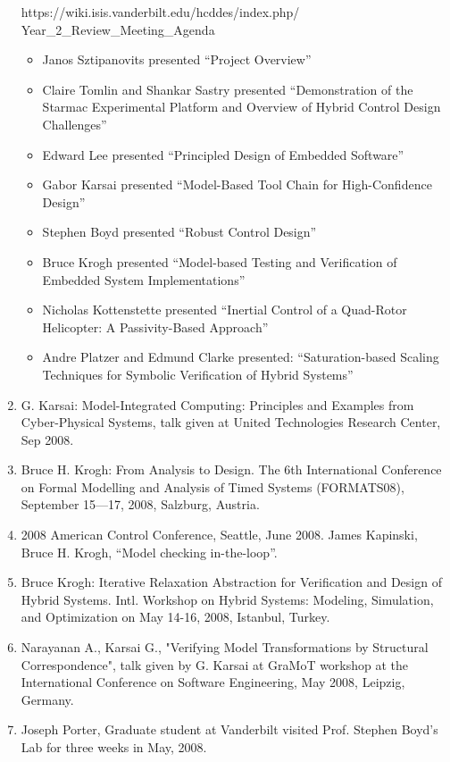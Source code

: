 \begin{enumerate}
https://wiki.isis.vanderbilt.edu/hcddes/index.php/ \\
\indent Year\_2\_Review\_Meeting\_Agenda

\begin{itemize}
\item Janos Sztipanovits presented ``Project Overview''
\item Claire Tomlin and Shankar Sastry presented ``Demonstration of the Starmac Experimental Platform and Overview of Hybrid Control Design Challenges''
\item Edward Lee presented ``Principled Design of Embedded Software''
\item Gabor Karsai presented ``Model-Based Tool Chain for High-Confidence Design''
\item Stephen Boyd presented ``Robust Control Design''
\item Bruce Krogh presented ``Model-based Testing and Verification of Embedded System Implementations''
\item Nicholas Kottenstette presented ``Inertial Control of a Quad-Rotor Helicopter: A Passivity-Based Approach''
\item Andre Platzer and Edmund Clarke presented: ``Saturation-based Scaling Techniques for Symbolic Verification of Hybrid Systems''
\end{itemize}
\item G. Karsai: Model-Integrated Computing: Principles and Examples from Cyber-Physical Systems, talk given at United Technologies Research Center, Sep 2008.
\item Bruce H. Krogh: From Analysis to Design. The 6th International Conference on Formal Modelling and Analysis of Timed Systems (FORMATS08), September 15—17, 2008, Salzburg, Austria. 
\item 2008 American Control Conference, Seattle, June 2008. James Kapinski, Bruce H. Krogh, ``Model checking in-the-loop''.
\item Bruce Krogh: Iterative Relaxation Abstraction for Verification and Design of Hybrid Systems. Intl. Workshop on Hybrid Systems: Modeling, Simulation, and Optimization on May 14-16, 2008, Istanbul, Turkey.
\item Narayanan A., Karsai G., "Verifying Model Transformations by Structural Correspondence", talk given by G. Karsai at GraMoT workshop at the International Conference on Software Engineering, May 2008, Leipzig, Germany.
\item Joseph Porter, Graduate student at Vanderbilt visited Prof. Stephen Boyd’s Lab for three weeks in May, 2008.

\end{enumerate}
